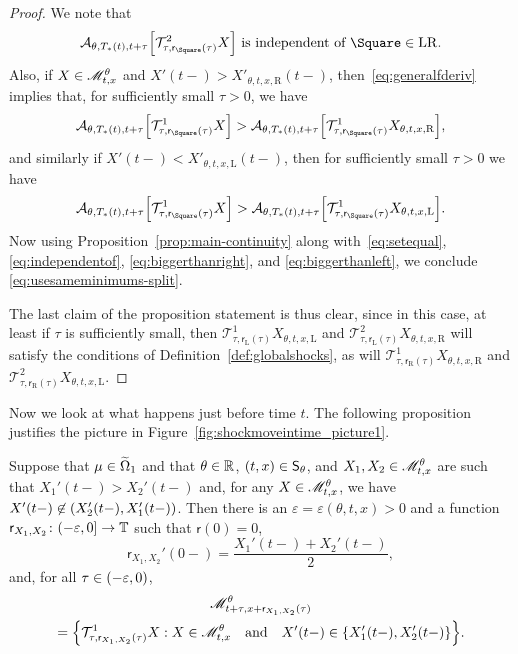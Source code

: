 \documentclass[AHL,Unicode,longabstracts]{cedram}
\newcounter{setofcase}
\newcounter{case}[setofcase]
\newcommand*\ssS{\mathsf{S}}
\newcommand*\sfr{\mathsf{r}}
\newcommand*\scM{\mathscr{M}}
\newcommand*\TT{\mathbb{T}}
\newcommand*\RR{\mathbb{R}}
\newcommand{\clA}{\mathcal{A}}
\newcommand{\clT}{\mathcal{T}}
\newcommand*\st{\mathrel{:}}
\newcommand*\Left{\mathrm{L}}
\newcommand*\Right{\mathrm{R}}
\newcommand*\LR{\mathrm{LR}}
\newcommand*\eps{\varepsilon}
\renewcommand*{\to}{\mathchoice{\longrightarrow}{\rightarrow}{\rightarrow}{\rightarrow}}
\let\oldin\in
\renewcommand{\in}{\mathchoice{\oldin}{\oldin}{\,\oldin\,}{\,\oldin\,}}
\let\originalleft\left
\let\originalright\right
\renewcommand{\left}{\mathopen{}\mathclose\bgroup\originalleft}
\renewcommand{\right}{\aftergroup\egroup\originalright}
\newcommand*\TT{\mathbb{T}}
\newcommand*\RR{\mathbb{R}}
\begin{document}
\begin{proof}
We note that
\begin{equation}\label{eq:independentof}
\clA_{\theta,T_{*}(t),t+\tau}\left[\clT_{\tau,\sfr_{\Square}(\tau)}^{2}X\right]\text{ is independent of }\Square\in\LR.
\end{equation}
Also, if $X\in\scM_{t,x}^{\theta}$ and $X'(t-)>X'_{\theta,t,x,\Right}(t-)$, then~\eqref{eq:generalfderiv} implies that, for sufficiently small $\tau>0$, we have
\begin{equation}\label{eq:biggerthanright}
\clA_{\theta,T_{*}(t),t+\tau}\left[\clT_{\tau,\sfr_{\Square}(\tau)}^{1}X\right]>\clA_{\theta,T_{*}(t),t+\tau}\left[\clT_{\tau,\sfr_{\Square}(\tau)}^{1}X_{\theta,t,x,\Right}\right],
\end{equation}
and similarly if $X'(t-)<X'_{\theta,t,x,\Left}(t-)$, then for sufficiently small $\tau>0$ we have
\begin{equation}\label{eq:biggerthanleft}
\clA_{\theta,T_{*}(t),t+\tau}\left[\clT_{\tau,\sfr_{\Square}(\tau)}^{1}X\right]>\clA_{\theta,T_{*}(t),t+\tau}\left[\clT_{\tau,\sfr_{\Square}(\tau)}^{1}X_{\theta,t,x,\Left}\right].
\end{equation}
Now using Proposition~\ref{prop:main-continuity} along with~\eqref{eq:setequal},
\eqref{eq:independentof}, \eqref{eq:biggerthanright}, and \eqref{eq:biggerthanleft}, we conclude \eqref{eq:usesameminimums-split}.

The last claim of the proposition statement is thus clear, since in this case, at least if $\tau$ is sufficiently small, then $\clT_{\tau,\sfr_{\Left}(\tau)}^{1}X_{\theta,t,x,\Left}$ and $\clT_{\tau,\sfr_{\Left}(\tau)}^{2}X_{\theta,t,x,\Right}$ will satisfy the conditions of Definition~\ref{def:globalshocks}, as will $\clT_{\tau,\sfr_{\Right}(\tau)}^{1}X_{\theta,t,x,\Right}$ and $\clT_{\tau,\sfr_{\Right}(\tau)}^{2}X_{\theta,t,x,\Left}$.
\end{proof}

Now we look at what happens just before time $t$. The following proposition justifies the picture in Figure~\ref{fig:shockmoveintime_picture1}.
\begin{prop}\label{prop:backwards}
Suppose that $\mu\in\widetilde{\Omega}_{1}$ and that $\theta\in\RR$, $(t,x)\in\ssS_{\theta}$, and $X_{1},X_{2}\in\scM_{t,x}^{\theta}$ are such that $X_{1}'(t-)>X_{2}'(t-)$ and, for any $X\in\scM_{t,x}^{\theta}$, we have $X'(t-)\not\in(X_{2}'(t-),X_{1}'(t-))$. Then there is an $\eps=\eps(\theta,t,x)>0$ and a function $\sfr_{X_{1},X_{2}}\colon(-\eps,0]\to\TT$ such that $\sfr(0)=0$,
\begin{equation}\label{eq:rderiv-LR-1}
\sfr_{X_{1},X_{2}}'(0-)=\frac{X_{1}'(t-)+X_{2}'(t-)}{2},
\end{equation}
and, for all $\tau\in(-\eps,0)$,
\begin{multline}\label{eq:useminimizers-before}
\scM_{t+\tau,x+\sfr_{X_{1},X_{2}}(\tau)}^{\theta}\\
=\left\{ \clT_{\tau,\sfr_{X_{1},X_{2}}(\tau)}^{1}X\st X\in\scM_{t,x}^{\theta}\quad\text{and}\quad X'(t-)\in\{X_{1}'(t-),X_{2}'(t-)\}\right\}.
\end{multline}
\end{prop}
\end{document}
